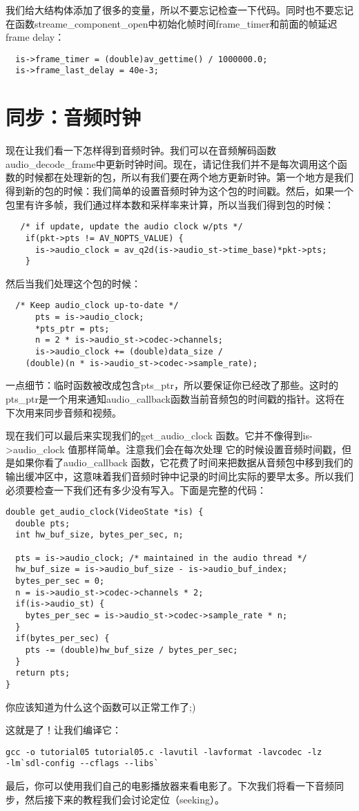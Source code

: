 我们给大结构体添加了很多的变量，所以不要忘记检查一下代码。同时也不要忘记在函数streame_component_open中初始化帧时间frame_timer和前面的帧延迟frame delay：

\begin{lstlisting}
  is->frame_timer = (double)av_gettime() / 1000000.0;
  is->frame_last_delay = 40e-3;
\end{lstlisting}

\section{同步：音频时钟}

现在让我们看一下怎样得到音频时钟。我们可以在音频解码函数audio_decode_frame中更新时钟时间。现在，请记住我们并不是每次调用这个函数的时候都在处理新的包，所以有我们要在两个地方更新时钟。第一个地方是我们得到新的包的时候：我们简单的设置音频时钟为这个包的时间戳。然后，如果一个包里有许多帧，我们通过样本数和采样率来计算，所以当我们得到包的时候：

\begin{lstlisting}
   /* if update, update the audio clock w/pts */
    if(pkt->pts != AV_NOPTS_VALUE) {
      is->audio_clock = av_q2d(is->audio_st->time_base)*pkt->pts;
    }
\end{lstlisting}
然后当我们处理这个包的时候：
\begin{lstlisting}
  /* Keep audio_clock up-to-date */
      pts = is->audio_clock;
      *pts_ptr = pts;
      n = 2 * is->audio_st->codec->channels;
      is->audio_clock += (double)data_size /
    (double)(n * is->audio_st->codec->sample_rate);
\end{lstlisting}

一点细节：临时函数被改成包含pts_ptr，所以要保证你已经改了那些。这时的pts_ptr是一个用来通知audio_callback函数当前音频包的时间戳的指针。这将在下次用来同步音频和视频。

现在我们可以最后来实现我们的get_audio_clock 函数。它并不像得到is->audio_clock 值那样简单。注意我们会在每次处理 它的时候设置音频时间戳，但是如果你看了audio_callback 函数，它花费了时间来把数据从音频包中移到我们的输出缓冲区中，这意味着我们音频时钟中记录的时间比实际的要早太多。所以我们必须要检查一下我们还有多少没有写入。下面是完整的代码：

\begin{lstlisting}
double get_audio_clock(VideoState *is) {
  double pts;
  int hw_buf_size, bytes_per_sec, n;

  pts = is->audio_clock; /* maintained in the audio thread */
  hw_buf_size = is->audio_buf_size - is->audio_buf_index;
  bytes_per_sec = 0;
  n = is->audio_st->codec->channels * 2;
  if(is->audio_st) {
    bytes_per_sec = is->audio_st->codec->sample_rate * n;
  }
  if(bytes_per_sec) {
    pts -= (double)hw_buf_size / bytes_per_sec;
  }
  return pts;
}
\end{lstlisting}

你应该知道为什么这个函数可以正常工作了;)

这就是了！让我们编译它：

\begin{lstlisting}
gcc -o tutorial05 tutorial05.c -lavutil -lavformat -lavcodec -lz
-lm`sdl-config --cflags --libs`
\end{lstlisting}

最后，你可以使用我们自己的电影播放器来看电影了。下次我们将看一下音频同步，然后接下来的教程我们会讨论定位（seeking）。
